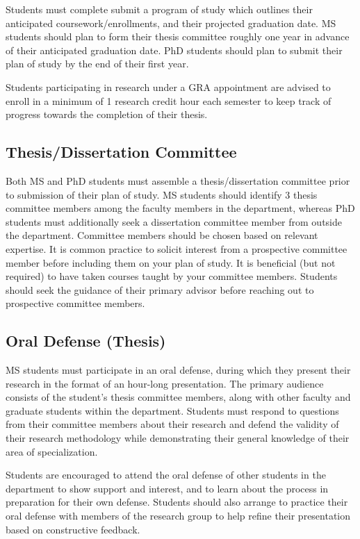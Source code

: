 \documentclass[12pt,a4paper,article,oneside]{memoir} %
\begin{document}
Students must complete submit a program of study which outlines their anticipated coursework/enrollments, and their projected graduation date. MS students should plan to form their thesis committee roughly one year in advance of their anticipated graduation date. PhD students should plan to submit their plan of study by the end of their first year.

Students participating in research under a GRA appointment are advised to enroll in a minimum of 1 research credit hour each semester to keep track of progress towards the completion of their thesis.

\subsection{Thesis/Dissertation Committee}

Both MS and PhD students must assemble a thesis/dissertation committee prior to submission of their plan of study. MS students should identify 3 thesis committee members among the faculty members in the department, whereas PhD students must additionally seek a dissertation committee member from outside the department. Committee members should be chosen based on relevant expertise. It is common practice to solicit interest from a prospective committee member before including them on your plan of study. It is beneficial (but not required) to have taken courses taught by your committee members. Students should seek the guidance of their primary advisor before reaching out to prospective committee members.

\subsection{Oral Defense (Thesis)}

MS students must participate in an oral defense, during which they present their research in the format of an hour-long presentation. The primary audience consists of the student's thesis committee members, along with other faculty and graduate students within the department. Students must respond to questions from their committee members about their research and defend the validity of their research methodology while demonstrating their general knowledge of their area of specialization.

Students are encouraged to attend the oral defense of other students in the department to show support and interest, and to learn about the process in preparation for their own defense. Students should also arrange to practice their oral defense with members of the research group to help refine their presentation based on constructive feedback.
\end{document}
